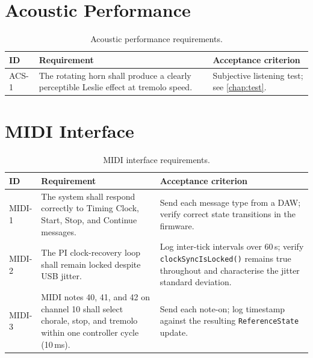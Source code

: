 \section{Acoustic Performance}

\begin{table}[H]
	\centering
	\begin{tabular}{p{1.2cm} p{5.5cm} p{6cm}}
		\toprule
		\textbf{ID} & \textbf{Requirement}                                                                  & \textbf{Acceptance criterion} \\
		\midrule
		ACS-1       & The rotating horn shall produce a clearly perceptible Leslie effect at tremolo speed. &
		Subjective listening test; see \autoref{chap:test}.                                                                                 \\
		\bottomrule
	\end{tabular}
	\caption{Acoustic performance requirements.}
	\label{tab:spec-acoustic}
\end{table}

\section{MIDI Interface}

\begin{table}[H]
	\centering
	\begin{tabular}{p{1.2cm} p{5.5cm} p{6cm}}
		\toprule
		\textbf{ID} & \textbf{Requirement}                                                                                                  & \textbf{Acceptance criterion} \\
		\midrule
		MIDI-1      & The system shall respond correctly to Timing Clock, Start, Stop, and Continue messages.                               &
		Send each message type from a DAW; verify correct state transitions in the firmware.                                                                                \\[4pt]
		MIDI-2      & The PI clock-recovery loop shall remain locked despite USB jitter.                                                    &
		Log inter-tick intervals over 60\,s; verify \texttt{clockSyncIsLocked()} remains true throughout and characterise the jitter standard deviation.                    \\[4pt]
		MIDI-3      & MIDI notes 40, 41, and 42 on channel 10 shall select chorale, stop, and tremolo within one controller cycle (10\,ms). &
		Send each note-on; log timestamp against the resulting \texttt{ReferenceState} update.                                                                              \\
		\bottomrule
	\end{tabular}
	\caption{MIDI interface requirements.}
	\label{tab:spec-midi}
\end{table}


